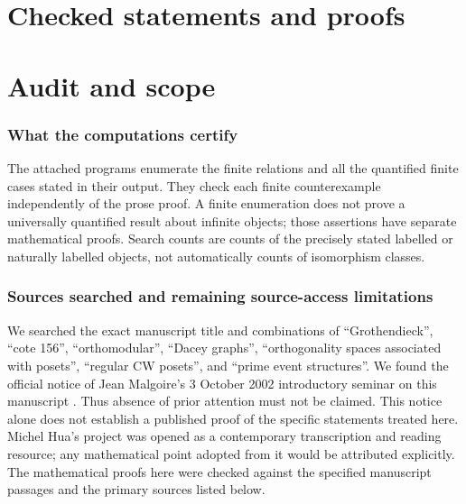 \documentclass[11pt,a4paper]{article}
\theoremstyle{definition}
\begin{document}
\part{Checked statements and proofs}




\clearpage
\part{Audit and scope}
\section{What the computations certify}
The attached programs enumerate the finite relations and all the
quantified finite cases stated in their output. They check each finite
counterexample independently of the prose proof. A finite enumeration
does not prove a universally quantified result about infinite objects;
those assertions have separate mathematical proofs. Search counts are
counts of the precisely stated labelled or naturally labelled objects,
not automatically counts of isomorphism classes.
\section{Sources searched and remaining source-access limitations}
We searched the exact manuscript title and combinations of
``Grothendieck'', ``cote 156'', ``orthomodular'', ``Dacey graphs'',
``orthogonality spaces associated with posets'', ``regular CW posets'',
and ``prime event structures''. We found the official notice of
Jean Malgoire's 3 October 2002 introductory seminar on this manuscript
\citep{Malgoire2002}. Thus absence of prior attention must not be
claimed. This notice alone does not establish a published proof of
the specific statements treated here. Michel Hua's project was opened
as a contemporary transcription and reading resource; any mathematical
point adopted from it would be attributed explicitly. The mathematical
proofs here were checked against the specified manuscript passages
and the primary sources listed below.

\nocite{*}

\end{document}
